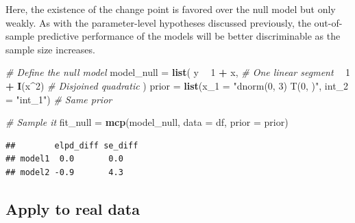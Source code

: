 \documentclass[
  american,
]{article}
\newenvironment{Shaded}{\begin{snugshade}}{\end{snugshade}}
\newcommand{\CommentTok}[1]{\textcolor[rgb]{0.56,0.35,0.01}{\textit{#1}}}
\newcommand{\DataTypeTok}[1]{\textcolor[rgb]{0.13,0.29,0.53}{#1}}
\newcommand{\DecValTok}[1]{\textcolor[rgb]{0.00,0.00,0.81}{#1}}
\newcommand{\KeywordTok}[1]{\textcolor[rgb]{0.13,0.29,0.53}{\textbf{#1}}}
\newcommand{\NormalTok}[1]{#1}
\newcommand{\OperatorTok}[1]{\textcolor[rgb]{0.81,0.36,0.00}{\textbf{#1}}}
\newcommand{\StringTok}[1]{\textcolor[rgb]{0.31,0.60,0.02}{#1}}
\begin{document}
Here, the existence of the change point is favored over the null model but only weakly. As with the parameter-level hypotheses discussed previously, the out-of-sample predictive performance of the models will be better discriminable as the sample size increases.

\begin{Shaded}
\begin{Highlighting}[]
\CommentTok{# Define the null model}
\NormalTok{model_null =}\StringTok{ }\KeywordTok{list}\NormalTok{(}
\NormalTok{  y }\OperatorTok{~}\StringTok{ }\DecValTok{1} \OperatorTok{+}\StringTok{ }\NormalTok{x,      }\CommentTok{# One linear segment}
    \OperatorTok{~}\StringTok{ }\DecValTok{1} \OperatorTok{+}\StringTok{ }\KeywordTok{I}\NormalTok{(x}\OperatorTok{^}\DecValTok{2}\NormalTok{)  }\CommentTok{# Disjoined quadratic}
\NormalTok{)}
\NormalTok{prior =}\StringTok{ }\KeywordTok{list}\NormalTok{(}\DataTypeTok{x_1 =} \StringTok{"dnorm(0, 3) T(0, )"}\NormalTok{, }\DataTypeTok{int_2 =} \StringTok{"int_1"}\NormalTok{)  }\CommentTok{# Same prior}

\CommentTok{# Sample it}
\NormalTok{fit_null =}\StringTok{ }\KeywordTok{mcp}\NormalTok{(model_null, }\DataTypeTok{data =}\NormalTok{ df, }\DataTypeTok{prior =}\NormalTok{ prior)}
\end{Highlighting}
\end{Shaded}

\begin{Shaded}
\end{Shaded}

\begin{verbatim}
##        elpd_diff se_diff
## model1  0.0       0.0   
## model2 -0.9       4.3
\end{verbatim}

\hypertarget{apply-to-real-data}{%
\subsection{Apply to real data}\label{apply-to-real-data}}
\end{document}
